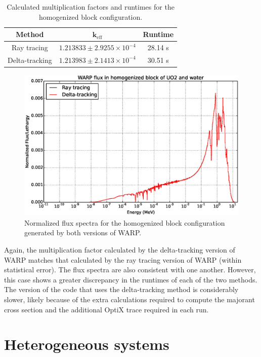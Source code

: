 \begin{table}[h!]
\centering
\caption{Calculated multiplication factors and runtimes for the homogenized block configuration.}
\label{hom_table}
\begin{tabular}{| c | c | c |}
\hline
\textbf{Method} & $\mathbf{k_{\mathrm{eff}}}$ & \textbf{Runtime} \\
\hline
Ray tracing & $1.213833 \pm 2.9255 \times 10^{-4}$ & 28.14 s \\
Delta-tracking & $1.213983 \pm 2.1413 \times 10^{-4}$ & 30.51 s \\
\hline
\end{tabular}
\end{table}

\begin{figure}[h!]
\includegraphics[width=\textwidth]{img/homfuel.eps}
\caption{Normalized flux spectra for the homogenized block configuration generated by both 
versions of WARP. \label{homfuel}}
\end{figure}

Again, the multiplication factor calculated by the delta-tracking version of WARP matches that calculated
by the ray tracing version of WARP (within statistical error). The flux spectra are also consistent with
one another. However, this case shows a greater discrepancy in the runtimes of each of the two methods. 
The version of the code that uses the delta-tracking method is considerably slower, likely because of the
extra calculations required to compute the majorant cross section and the additional OptiX trace required 
in each run.

\section{Heterogeneous systems}
\label{sec:hetero}

